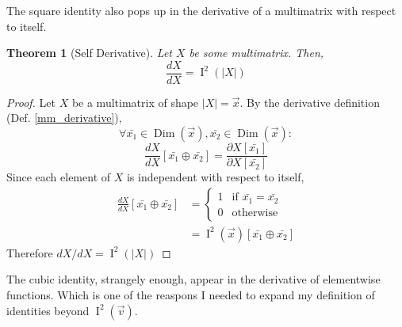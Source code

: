 \documentclass[12pt]{book}
\theoremstyle{definition}
\theoremstyle{plain}
\newtheorem{theorem}{Theorem}[chapter]
\theoremstyle{ppart}
\theoremstyle{case}
\theoremstyle{solution}
\DeclareMathOperator{\Dim}{Dim}
\DeclareMathOperator{\Ident}{I}
\begin{document}
The square identity also pops up in the derivative of a multimatrix
with respect to itself.

\begin{theorem}[Self Derivative]
Let $X$ be some multimatrix. Then,
\[ \frac{dX}{dX} = \Ident^2(|X|) \]
\end{theorem}
\begin{proof}
Let $X$ be a multimatrix of shape $|X|=\vec{x}$.
By the derivative definition (Def. \ref{mm_derivative}),
\[
 \forall \bar{x_1} \in \Dim(\vec{x}),
         \bar{x_2} \in \Dim(\vec{x}):
\]
\[
 \frac{dX}{dX}[\bar{x_1} \oplus \bar{x_2}] = 
 \frac{\partial X[\bar{x_1}]}{\partial X[\bar{x_2}]}
\]
Since each element of $X$ is independent with respect to itself,
\begin{align*}
 \frac{dX}{dX}[\bar{x_1} \oplus \bar{x_2}]
 &= \left\{
  \begin{array}{ll}
    1 & \mbox{if } \bar{x_1} = \bar{x_2} \\
    0 & \mbox{otherwise}
  \end{array}
 \right. \\
 &= \Ident^2(\vec{x})[\bar{x_1} \oplus \bar{x_2}]
\end{align*}
Therefore $dX/dX = \Ident^2(|X|)$
\end{proof}

The cubic identity, strangely enough, appear in the derivative of elementwise
functions. Which is one of the reaspons I needed to expand my definition of
identities beyond $\Ident^2(\vec{v})$.
\end{document}
